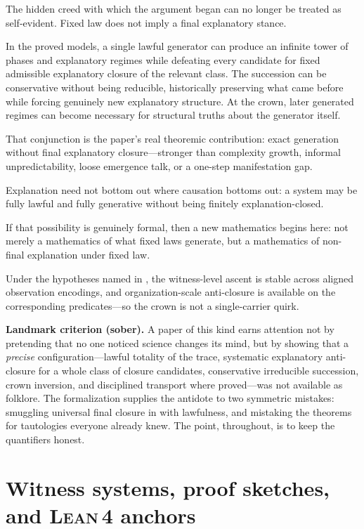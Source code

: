 \documentclass[11pt,a4paper]{article}
\theoremstyle{definition}
\newcommand{\lean}{\textsc{Lean}\,4}
\begin{document}
The hidden creed with which the argument began can no longer be treated as self-evident. Fixed law does not imply a final explanatory stance.

In the proved models, a single lawful generator can produce an infinite tower of phases and explanatory regimes while defeating every candidate for fixed admissible explanatory closure of the relevant class. The succession can be conservative without being reducible, historically preserving what came before while forcing genuinely new explanatory structure. At the crown, later generated regimes can become necessary for structural truths about the generator itself.

That conjunction is the paper's real theoremic contribution: exact generation without final explanatory closure---stronger than complexity growth, informal unpredictability, loose emergence talk, or a one-step manifestation gap.

Explanation need not bottom out where causation bottoms out: a system may be fully lawful and fully generative without being finitely explanation-closed.

If that possibility is genuinely formal, then a new mathematics begins here: not merely a mathematics of what fixed laws generate, but a mathematics of non-final explanation under fixed law.

\medskip
\noindent
Under the hypotheses named in , the witness-level ascent is stable across aligned observation encodings, and organization-scale anti-closure is available on the corresponding predicates---so the crown is not a single-carrier quirk.

\medskip
\noindent
\textbf{Landmark criterion (sober).} A paper of this kind earns attention not by pretending that no one noticed science changes its mind, but by showing that a \emph{precise} configuration---lawful totality of the trace, systematic explanatory anti-closure for a whole class of closure candidates, conservative irreducible succession, crown inversion, and disciplined transport where proved---was not available as folklore. The formalization supplies the antidote to two symmetric mistakes: smuggling universal final closure in with lawfulness, and mistaking the theorems for tautologies everyone already knew. The point, throughout, is to keep the quantifiers honest.

\appendix

\section{Witness systems, proof sketches, and \texorpdfstring{\lean{} anchors}{Lean~4 anchors}}\label{sec:witnesses-proofs}
\end{document}
